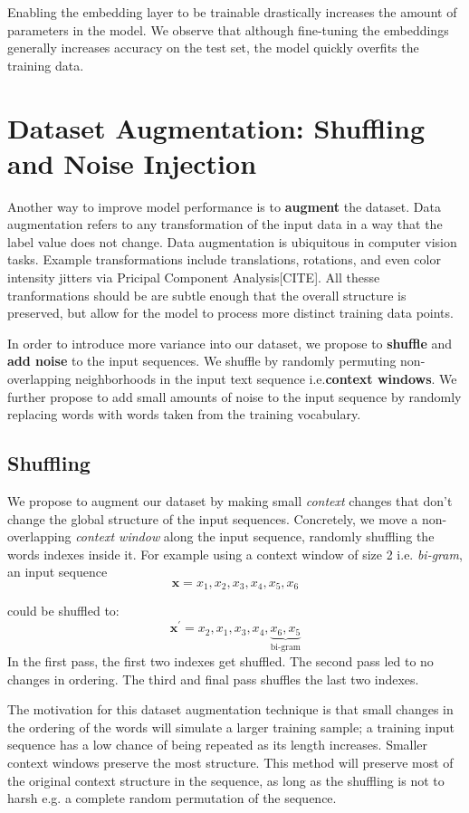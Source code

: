 Enabling the embedding layer to be trainable drastically increases the amount of parameters in the model. We observe that
although fine-tuning the embeddings generally increases accuracy on the test set, the model quickly overfits the training data.

\section{Dataset Augmentation: Shuffling and Noise Injection}
Another way to improve model performance is to \textbf{augment} the dataset.
Data augmentation refers to any transformation of the input data in a way that
the label value does not change. Data augmentation is ubiquitous in computer vision tasks. Example transformations include translations, rotations, and even color intensity jitters via Pricipal Component
Analysis[CITE]. All thesse tranformations should be are subtle enough that the overall structure is preserved, but
allow for the model to process more distinct training data points.

In order to introduce more variance into our dataset, we propose to \textbf{shuffle} and \textbf{add noise} to the input sequences.
We shuffle by randomly permuting non-overlapping neighborhoods in the input text sequence i.e.\textbf{context windows}.
We further propose to add small amounts of
noise to the input sequence by randomly replacing words with words taken from the training vocabulary.

\subsection{Shuffling}
We propose to augment our dataset by making small \textit{context} changes that don't change the global structure
of the input sequences. Concretely, we move a non-overlapping \textit{context window} along the input sequence, randomly
shuffling the words indexes inside it. For example using a context window of size 2 i.e. \textit{bi-gram}, an input sequence
\[\bm{x} = x_1, x_2, x_3, x_4, x_5, x_6\]

 could be shuffled to:
\[\bm{x}^{\prime} = x_2, x_1, x_3, x_4, \underbrace{x_6, x_5}_\text{bi-gram}\]
In the first pass, the first two indexes get shuffled. The second pass led to no changes in ordering. The third and
final pass shuffles the last two indexes.

The motivation for this dataset augmentation technique is that small changes in the ordering of the words will
simulate a larger training sample; a training input sequence has a low chance of being repeated as its
length increases. Smaller context windows preserve the most structure. This method will preserve
most of the original context structure in the sequence, as long as the shuffling is not to harsh e.g.
a complete random permutation of the sequence.

